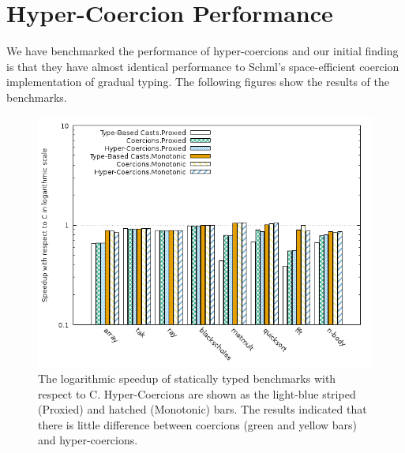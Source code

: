 \documentclass[acmtog, authorversion, acmlarge]{acmart}
\begin{document}
\section{Hyper-Coercion Performance}
\label{sec:perf}

We have benchmarked the performance of hyper-coercions and our initial
finding is that they have almost identical performance to Schml's
space-efficient coercion implementation of gradual typing.
The following figures show the results of the benchmarks.

\begin{figure}
  \includegraphics[scale=.47]{static.png}
  \caption{
    The logarithmic speedup of statically typed benchmarks
    with respect to C. Hyper-Coercions are shown as the light-blue
    striped (Proxied) and hatched (Monotonic) bars. The
    results indicated that there is little difference
    between coercions (green and yellow bars) and hyper-coercions. }
  \label{fig:static_results}
\end{figure}
\end{document}
